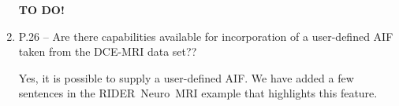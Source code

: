 \documentclass[11pt]{article}
\begin{document}
\begin{enumerate}
  \textbf{TO DO!}  

\item P.26 – Are there capabilities available for incorporation of a
  user-defined AIF taken from the DCE-MRI data set??

  Yes, it is possible to supply a user-defined AIF.  We have added a
  few sentences in the RIDER~Neuro~MRI example that highlights this
  feature.

\end{enumerate}




\end{document}
